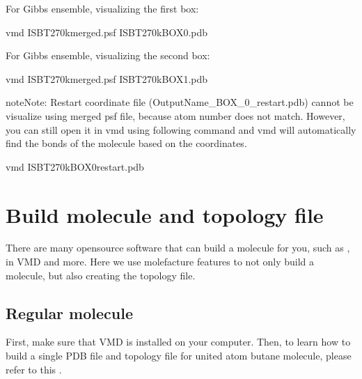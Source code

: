 \documentclass[letterpaper,10pt,english]{sphinxmanual}
\begin{document}
For Gibbs ensemble, visualizing the first box:

\begin{sphinxVerbatim}[commandchars=\\\{\}]
\PYGZdl{} vmd   ISB\PYGZus{}T\PYGZus{}270\PYGZus{}k\PYGZus{}merged.psf  ISB\PYGZus{}T\PYGZus{}270\PYGZus{}k\PYGZus{}BOX\PYGZus{}0.pdb
\end{sphinxVerbatim}

For Gibbs ensemble, visualizing the second box:

\begin{sphinxVerbatim}[commandchars=\\\{\}]
\PYGZdl{} vmd   ISB\PYGZus{}T\PYGZus{}270\PYGZus{}k\PYGZus{}merged.psf  ISB\PYGZus{}T\PYGZus{}270\PYGZus{}k\PYGZus{}BOX\PYGZus{}1.pdb
\end{sphinxVerbatim}

\begin{sphinxadmonition}{note}{Note:}
Restart coordinate file (OutputName\_BOX\_0\_restart.pdb) cannot be visualize using merged psf file, because atom number does not match. However, you can still open it in vmd using following command and vmd will automatically find the bonds of the molecule based on the coordinates.
\end{sphinxadmonition}

\begin{sphinxVerbatim}[commandchars=\\\{\}]
\PYGZdl{} vmd   ISB\PYGZus{}T\PYGZus{}270\PYGZus{}k\PYGZus{}BOX\PYGZus{}0\PYGZus{}restart.pdb
\end{sphinxVerbatim}


\section{Build molecule and topology file}
\label{\detokenize{howto:build-molecule-and-topology-file}}
There are many open\sphinxhyphen{}source software that can build a molecule for you, such as  ,
 in VMD and more. Here we use molefacture features to not only build a molecule,
but also creating the topology file.


\subsection{Regular molecule}
\label{\detokenize{howto:regular-molecule}}
First, make sure that VMD is installed on your computer. Then, to learn how to build a single PDB file and topology file for united atom butane molecule,
please refer to this  .
\end{document}
